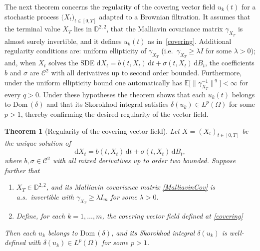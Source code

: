 \documentclass[]{interact}
\newcommand{\Dom}{\mathrm{Dom}\,}
\newcommand{\1}{\mathbf{1}}
\theoremstyle{plain}%
\newtheorem{theorem}{Theorem}[section]
\theoremstyle{definition}
\theoremstyle{remark}
\numberwithin{equation}{section}
\begin{document}
\noindent 
The next theorem concerns the regularity of the covering vector field \(u_k(t)\) for a stochastic process \(\bigl(X_t\bigr)_{t\in[0,T]}\) adapted to a Brownian filtration.  
It assumes that the terminal value \(X_T\) lies in \(\mathbb{D}^{2,2}\), that the Malliavin covariance matrix \(\gamma_{X_T}\) is almost surely invertible, and it defines \(u_k(t)\) as in~\eqref{covering}.  
Additional regularity conditions are: uniform ellipticity of \(\gamma_{X_T}\) (i.e.\ \(\gamma_{X_T}\ge\lambda I\) for some \(\lambda>0\)); and, when \(X_t\) solves the SDE \(\mathrm dX_t = b(t,X_t)\,\mathrm dt + \sigma(t,X_t)\,\mathrm dB_t\), the coefficients \(b\) and \(\sigma\) are \(\mathcal{C}^2\) with all derivatives up to second order bounded.  
Furthermore, under the uniform ellipticity bound one automatically has \(\mathbb{E}\bigl[\|\gamma_{X_T}^{-1}\|^{\,q}\bigr]<\infty\) for every \(q>0\).  
Under these hypotheses the theorem shows that each \(u_k(t)\) belongs to \(\Dom(\delta)\) and that its Skorokhod integral satisfies \(\delta(u_k)\in L^{p}(\Omega)\) for some \(p>1\), thereby confirming the desired regularity of the vector field.







\begin{theorem}[Regularity of the covering vector field]
Let \(X = (X_t)_{t\in[0,T]}\) be the unique solution of
\[
  \mathrm dX_t = b(t,X_t)\,\mathrm dt + \sigma(t,X_t)\,\mathrm dB_t,
\]
where \(b,\sigma\in \mathcal{C}^2\) with all mixed derivatives up to order two bounded.  Suppose further that
\begin{enumerate}[label=(\roman*)]
  \item \(X_T\in\mathbb D^{2,2}\), and its Malliavin covariance matrix \eqref{MalliavinCov}
    is a.s.\ invertible with
    \(\gamma_{X_T}\ge\lambda I_m\) for some \(\lambda>0\).
  \item Define, for each \(k=1,\dots,m\), the covering vector field defined at \eqref{covering}
\end{enumerate}
Then each \(u_k\) belongs to \(\Dom(\delta)\), and its Skorokhod integral
\(\delta(u_k)\) is well-defined with \(\delta(u_k)\in L^p(\Omega)\) for some \(p>1\).
\end{theorem}
\end{document}
